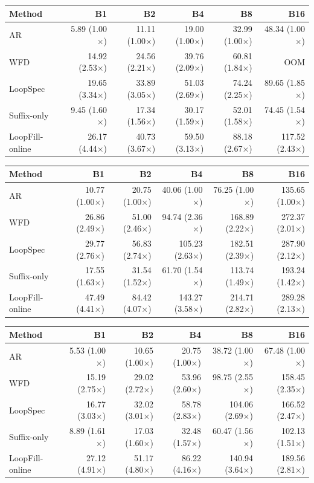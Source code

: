\begin{tabular}{lrrrrr}
\hline
Method & B1 & B2 & B4 & B8 & B16 \\
\hline
AR & 5.89 (1.00$\times$) & 11.11 (1.00$\times$) & 19.00 (1.00$\times$) & 32.99 (1.00$\times$) & 48.34 (1.00$\times$) \\
WFD & 14.92 (2.53$\times$) & 24.56 (2.21$\times$) & 39.76 (2.09$\times$) & 60.81 (1.84$\times$) & OOM \\
LoopSpec & 19.65 (3.34$\times$) & 33.89 (3.05$\times$) & 51.03 (2.69$\times$) & 74.24 (2.25$\times$) & 89.65 (1.85$\times$) \\
Suffix-only & 9.45 (1.60$\times$) & 17.34 (1.56$\times$) & 30.17 (1.59$\times$) & 52.01 (1.58$\times$) & 74.45 (1.54$\times$) \\
LoopFill-online & 26.17 (4.44$\times$) & 40.73 (3.67$\times$) & 59.50 (3.13$\times$) & 88.18 (2.67$\times$) & 117.52 (2.43$\times$) \\
\hline
\end{tabular}

\begin{tabular}{lrrrrr}
\hline
Method & B1 & B2 & B4 & B8 & B16 \\
\hline
AR & 10.77 (1.00$\times$) & 20.75 (1.00$\times$) & 40.06 (1.00$\times$) & 76.25 (1.00$\times$) & 135.65 (1.00$\times$) \\
WFD & 26.86 (2.49$\times$) & 51.00 (2.46$\times$) & 94.74 (2.36$\times$) & 168.89 (2.22$\times$) & 272.37 (2.01$\times$) \\
LoopSpec & 29.77 (2.76$\times$) & 56.83 (2.74$\times$) & 105.23 (2.63$\times$) & 182.51 (2.39$\times$) & 287.90 (2.12$\times$) \\
Suffix-only & 17.55 (1.63$\times$) & 31.54 (1.52$\times$) & 61.70 (1.54$\times$) & 113.74 (1.49$\times$) & 193.24 (1.42$\times$) \\
LoopFill-online & 47.49 (4.41$\times$) & 84.42 (4.07$\times$) & 143.27 (3.58$\times$) & 214.71 (2.82$\times$) & 289.28 (2.13$\times$) \\
\hline
\end{tabular}

\begin{tabular}{lrrrrr}
\hline
Method & B1 & B2 & B4 & B8 & B16 \\
\hline
AR & 5.53 (1.00$\times$) & 10.65 (1.00$\times$) & 20.75 (1.00$\times$) & 38.72 (1.00$\times$) & 67.48 (1.00$\times$) \\
WFD & 15.19 (2.75$\times$) & 29.02 (2.72$\times$) & 53.96 (2.60$\times$) & 98.75 (2.55$\times$) & 158.45 (2.35$\times$) \\
LoopSpec & 16.77 (3.03$\times$) & 32.02 (3.01$\times$) & 58.78 (2.83$\times$) & 104.06 (2.69$\times$) & 166.52 (2.47$\times$) \\
Suffix-only & 8.89 (1.61$\times$) & 17.03 (1.60$\times$) & 32.48 (1.57$\times$) & 60.47 (1.56$\times$) & 102.13 (1.51$\times$) \\
LoopFill-online & 27.12 (4.91$\times$) & 51.17 (4.80$\times$) & 86.22 (4.16$\times$) & 140.94 (3.64$\times$) & 189.56 (2.81$\times$) \\
\hline
\end{tabular}
